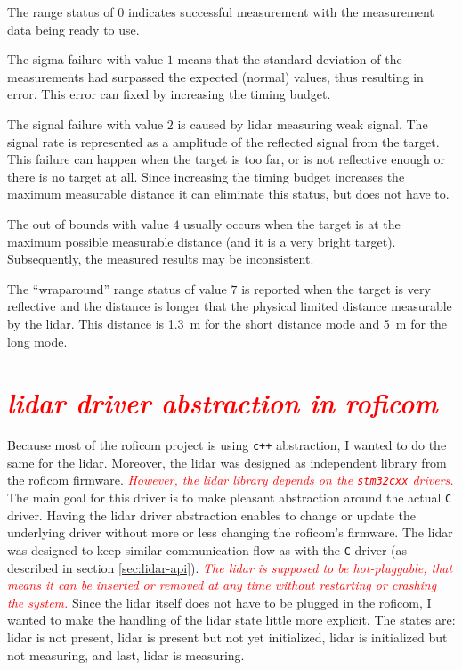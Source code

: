 \documentclass[
  digital,     %
  oneside,     %
  nosansbold,  %
  nocolorbold, %
  lof,         %
  lot,         %
]{fithesis4}
\newcommand{\TODO}[1]{\textcolor{red}{\textit{#1}}}
\begin{document}
{{{The range status of $0$ indicates successful measurement with the measurement data being ready to use.

The sigma failure with value $1$ means that the standard deviation of the measurements had surpassed the expected (normal) values, thus resulting in error. This error can fixed by increasing the timing budget.

The signal failure with value $2$ is caused by \acrshort{lidar} measuring weak signal. The signal rate is represented as a amplitude of the reflected signal from the target. This failure can happen when the target is too far, or is not reflective enough or there is no target at all. Since increasing the timing budget increases the maximum measurable distance it can eliminate this status, but does not have to.

The out of bounds with value $4$ usually occurs when the target is at the maximum possible measurable distance (and it is a very bright target). Subsequently, the measured results may be inconsistent.

The ``wraparound'' range status of value $7$ is reported when the target is very reflective and the distance is longer that the physical limited distance measurable by the \acrshort{lidar}. This distance is \qty{1.3}{\metre} for the short distance mode and \qty{5}{\metre} for the long mode.

\section{ \TODO{ \acrshort{lidar} driver abstraction in \acrshort{roficom} } }

Because most of the \acrshort{roficom} project is using \verb|c++| abstraction, I wanted to do the same for the \acrshort{lidar}. Moreover, the \acrshort{lidar} was designed as independent library from the \acrshort{roficom} firmware. \TODO{However, the \acrshort{lidar} library depends on the \texttt{stm32cxx} drivers.} The main goal for this driver is to make pleasant abstraction around the actual \verb|C| driver. Having the \acrshort{lidar} driver abstraction enables to change or update the underlying driver without more or less changing the \acrshort{roficom}'s firmware. The \acrshort{lidar} was designed to keep similar communication flow as with the \verb|C| driver (as described in section \ref{sec:lidar-api}). \TODO{The \acrshort{lidar} is supposed to be \emph{hot-pluggable}, that means it can be inserted or removed at any time without restarting or crashing the system.} Since the \acrshort{lidar} itself does not have to be plugged in the \acrshort{roficom}, I wanted to make the handling of the \acrshort{lidar} state little more explicit. The states are: \acrshort{lidar} is not present, \acrshort{lidar} is present but not yet initialized, \acrshort{lidar} is initialized but not measuring, and last, \acrshort{lidar} is measuring. 

}}}
\end{document}
